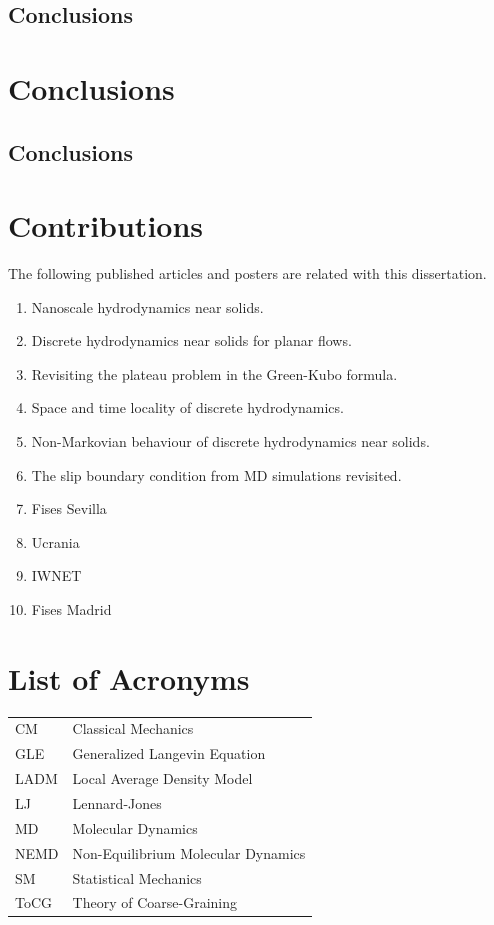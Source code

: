 \documentclass[a4paper,openright,12pt]{book}
\begin{document}
\section{Conclusions}


\chapter{Conclusions}\label{cap.Conclusions}
\section{Conclusions}

\appendix
\chapter{Contributions}\label{Ap:Contributions}
The following published articles and posters are related with this dissertation.
\begin{enumerate}
  \item Nanoscale hydrodynamics near solids.
  \item Discrete hydrodynamics near solids for planar flows.
  \item Revisiting the plateau problem in the Green-Kubo formula.
  \item Space and time locality of discrete hydrodynamics.
  \item Non-Markovian behaviour of discrete hydrodynamics near solids.
  \item The slip boundary condition from MD simulations revisited.
  \item Fises Sevilla
  \item Ucrania
  \item IWNET
  \item Fises Madrid
\end{enumerate}


\chapter{List of Acronyms}\label{Ap:Acronyms}
\begin{tabular}{l l}
    CM & Classical Mechanics \\
    GLE & Generalized Langevin Equation \\
    LADM & Local Average Density Model \\
    LJ & Lennard-Jones \\
    MD & Molecular Dynamics \\
    NEMD & Non-Equilibrium Molecular Dynamics\\
    SM & Statistical Mechanics \\
    ToCG & Theory of Coarse-Graining \\
\end{tabular}
\end{document}
